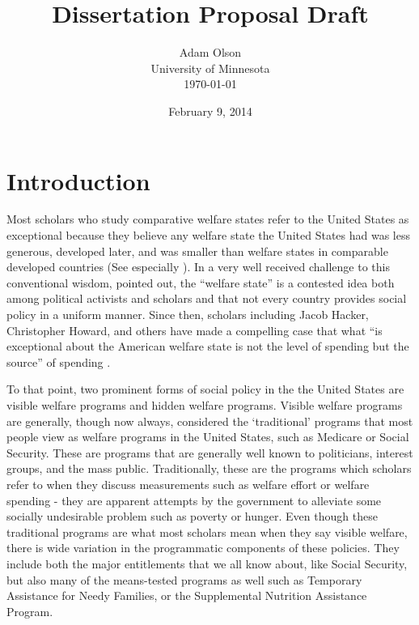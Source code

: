 \documentclass[12pt]{article}
\author{Adam Olson\\University of Minnesota\\ \today}
\title{Dissertation Proposal Draft}
\date{February 9, 2014}
\makeatletter
\renewcommand{\maketitle}{\bgroup\setlength{\parindent}{0pt}
\begin{flushleft}
  \textbf{\@title}

  \@author
\end{flushleft}\egroup
}
\makeatother
\begin{document}
\maketitle

\section{Introduction}
Most scholars who study comparative welfare states refer to the United States as exceptional because they believe any welfare state the United States had was less generous, developed later, and was smaller than welfare states in comparable developed countries (See especially \citealt{andersen1990}). In a very well received challenge to this conventional wisdom, \citet{hacker2002} pointed out, the ``welfare state'' is a contested idea both among political activists and scholars and that not every country provides social policy in a uniform manner. Since then, scholars including Jacob Hacker, Christopher Howard, and others have made a compelling case that what ``is exceptional about the American welfare state is not the level of spending but the source'' of spending \citep[pg. 7]{hacker2002}.

To that point, two prominent forms of social policy in the the United States are visible welfare programs and hidden welfare programs. Visible welfare programs are generally, though now always, considered the `traditional' programs that most people view as welfare programs in the United States, such as Medicare or Social Security. These are programs that are generally well known to politicians, interest groups, and the mass public. Traditionally, these are the programs which scholars refer to when they discuss measurements such as welfare effort or welfare spending - they are apparent attempts by the government to alleviate some socially undesirable problem such as poverty or hunger. Even though these traditional programs are what most scholars mean when they say visible welfare, there is wide variation in the programmatic components of these policies. They include both the major entitlements that we all know about, like Social Security, but also many of the means-tested programs as well such as Temporary Assistance for Needy Families, or the Supplemental Nutrition Assistance Program.
\end{document}
